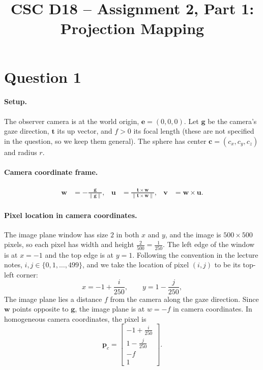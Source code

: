 \documentclass[11pt]{article}
\title{CSC D18 -- Assignment 2, Part 1: Projection Mapping}
\author{}
\date{}
\newcommand{\vect}[1]{\mathbf{#1}}
\begin{document}
\maketitle

\section*{Question 1}

\paragraph{Setup.}
The observer camera is at the world origin, $\vect{e} = (0,0,0)$. Let $\vect{g}$ be the
camera's gaze direction, $\vect{t}$ its up vector, and $f > 0$ its focal length (these
are not specified in the question, so we keep them general). The sphere has center
$\vect{c} = (c_x, c_y, c_z)$ and radius $r$.

\paragraph{Camera coordinate frame.}
\begin{align*}
  \vect{w} &= -\frac{\vect{g}}{\lVert \vect{g} \rVert}, &
  \vect{u} &= \frac{\vect{t} \times \vect{w}}{\lVert \vect{t} \times \vect{w} \rVert}, &
  \vect{v} &= \vect{w} \times \vect{u}.
\end{align*}

\paragraph{Pixel location in camera coordinates.}
The image plane window has size $2$ in both $x$ and $y$, and the image is
$500 \times 500$ pixels, so each pixel has width and height $\frac{2}{500} = \frac{1}{250}$.
The left edge of the window is at $x = -1$ and the top edge is at $y = 1$. Following
the convention in the lecture notes, $i, j \in \{0, 1, \dots, 499\}$, and we take the
location of pixel $(i,j)$ to be its top-left corner:
\[
  x = -1 + \frac{i}{250}, \qquad y = 1 - \frac{j}{250},
\]
The image plane lies a distance $f$ from the camera along the gaze direction. Since
$\vect{w}$ points opposite to $\vect{g}$, the image plane is at $w = -f$ in camera
coordinates. In homogeneous camera coordinates, the pixel is
\[
  \vect{p}_c = \begin{bmatrix} -1 + \frac{i}{250} \\[2pt] 1 - \frac{j}{250} \\[2pt] -f \\ 1 \end{bmatrix}.
\]
\end{document}

